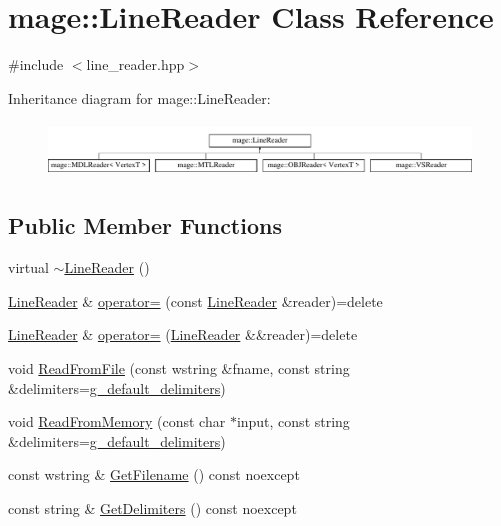 \hypertarget{classmage_1_1_line_reader}{}\section{mage\+:\+:Line\+Reader Class Reference}
\label{classmage_1_1_line_reader}


{\ttfamily \#include $<$line\+\_\+reader.\+hpp$>$}

Inheritance diagram for mage\+:\+:Line\+Reader\+:\begin{figure}[H]
\begin{center}
\leavevmode
\includegraphics[height=1.458333cm]{classmage_1_1_line_reader}
\end{center}
\end{figure}
\subsection*{Public Member Functions}
\begin{DoxyCompactItemize}
\item 
virtual \hyperlink{classmage_1_1_line_reader_ad9753ea392ebe5b3867852d3392fb1e7}{$\sim$\+Line\+Reader} ()
\item 
\hyperlink{classmage_1_1_line_reader}{Line\+Reader} \& \hyperlink{classmage_1_1_line_reader_a2247078d0b5602f9a9a6b74019832faf}{operator=} (const \hyperlink{classmage_1_1_line_reader}{Line\+Reader} \&reader)=delete
\item 
\hyperlink{classmage_1_1_line_reader}{Line\+Reader} \& \hyperlink{classmage_1_1_line_reader_a45504c0ba4238eedf851cfb9df081a01}{operator=} (\hyperlink{classmage_1_1_line_reader}{Line\+Reader} \&\&reader)=delete
\item 
void \hyperlink{classmage_1_1_line_reader_ac0f1c0e8a4142fe5b827b737c4efafbf}{Read\+From\+File} (const wstring \&fname, const string \&delimiters=\hyperlink{namespacemage_a10fe126e627cc2ce8af2cc39cc5db81e}{g\+\_\+default\+\_\+delimiters})
\item 
void \hyperlink{classmage_1_1_line_reader_a5557d14cbe3a22aec798541a85b5fd3e}{Read\+From\+Memory} (const char $\ast$input, const string \&delimiters=\hyperlink{namespacemage_a10fe126e627cc2ce8af2cc39cc5db81e}{g\+\_\+default\+\_\+delimiters})
\item 
const wstring \& \hyperlink{classmage_1_1_line_reader_a682ed8030c99a62d4409a01f9efa6d6b}{Get\+Filename} () const noexcept
\item 
const string \& \hyperlink{classmage_1_1_line_reader_aa00e1e27b614e11ec9f70e52d0bac551}{Get\+Delimiters} () const noexcept
\end{DoxyCompactItemize}

